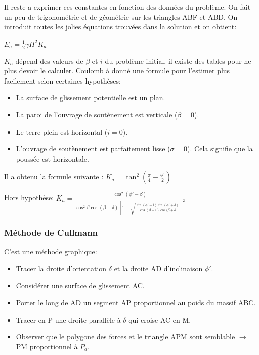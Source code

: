         Il reste a exprimer ces constantes en fonction des données du problème. On fait un peu de trigonométrie et de géométrie sur les triangles ABF et ABD. On introduit toutes les jolies équations trouvées dans la solution et on obtient:
        
        \begin{center}
            $E_a = \frac{1}{2} \gamma H^2 K_a $
        \end{center} 
        
        $K_a$ dépend des valeurs de $\beta$ et $i$ du problème initial, il existe des tables pour ne plus devoir le calculer. Coulomb à donné une formule pour l'estimer plus facilement selon certaines hypothèses: 
        \begin{itemize}
            \item La surface de glissement potentielle est un plan.
            \item La paroi de l'ouvrage de soutènement est verticale ($\beta = 0$).
            \item Le terre-plein est horizontal ($i = 0$).
            \item L'ouvrage de soutènement est parfaitement lisse ($\sigma = 0$). Cela signifie que la poussée est horizontale.
        \end{itemize} 
        
        Il a obtenu la formule suivante : $K_a = \tan^2(\frac{\pi}{4}-\frac{\phi'}{2})$ 
        
        Hors hypothèse: $K_a = \frac{\cos^2(\phi'-\beta)}{\cos^2\beta \cos(\beta+\delta)[1+\sqrt{\frac{\sin(\phi'-i) \sin(\phi'+\delta)}{\cos(\beta-i)\cos(\beta+\delta}}]^2}$
        
        \subsubsection{Méthode de Cullmann}
        
        C'est une méthode graphique:
        \begin{itemize}
            \item Tracer la droite d'orientation $\delta$ et la droite AD d'inclinaison $\phi'$.
            \item Considérer une surface de glissement AC.
            \item Porter le long de AD un segment AP proportionnel au poids du massif ABC.
            \item Tracer en P une droite parallèle à $\delta$ qui croise AC en M.
            \item Observer que le polygone des forces et le triangle APM sont semblable $\to$ PM proportionnel à $P_a$.
        \end{itemize} 
        
